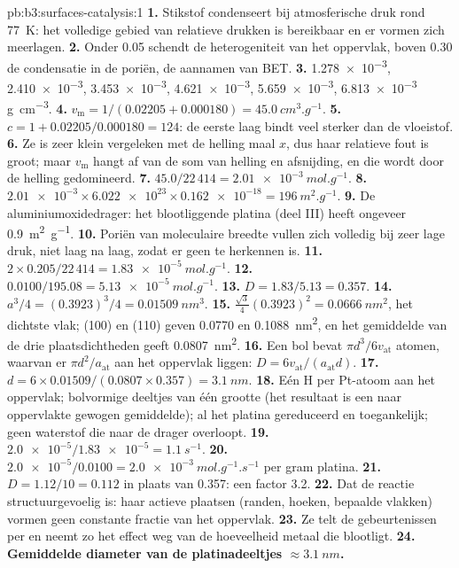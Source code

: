 \begin{solution}{pb:b3:surfaces-catalysis:1}
\textbf{1.} Stikstof condenseert bij atmosferische druk rond \qty{77}{K}: het
volledige gebied van relatieve drukken is bereikbaar en er vormen zich
meerlagen.
\textbf{2.} Onder 0.05 schendt de heterogeniteit van het oppervlak, boven
0.30 de condensatie in de poriën, de aannamen van BET.
\textbf{3.} \num{1.278e-3}, \num{2.410e-3}, \num{3.453e-3}, \num{4.621e-3}, \num{5.659e-3}, \num{6.813e-3} \unit{g.cm^{-3}}.
\textbf{4.} $v_{\mathrm m} = 1/(0.02205 + 0.000180) = \qty{45.0}{cm^3.g^{-1}}$.
\textbf{5.} $c = 1 + 0.02205/0.000180 = 124$: de eerste laag bindt veel sterker
dan de vloeistof.
\textbf{6.} Ze is zeer klein vergeleken met de helling maal $x$, dus haar
relatieve fout is groot; maar $v_{\mathrm m}$ hangt af van de som van helling en afsnijding, en die wordt door de helling
gedomineerd.
\textbf{7.} $45.0/22\,414 = \qty{2.01e-3}{mol.g^{-1}}$.
\textbf{8.} $\num{2.01e-3} \times \num{6.022e23} \times \num{0.162e-18} = \qty{196}{m^2.g^{-1}}$.
\textbf{9.} De aluminiumoxidedrager: het blootliggende platina (deel III)
heeft ongeveer \qty{0.9}{m^2.g^{-1}}.
\textbf{10.} Poriën van moleculaire breedte vullen zich volledig bij zeer
lage druk, niet laag na laag, zodat er geen  te herkennen is.
\textbf{11.} $2 \times 0.205/22\,414 = \qty{1.83e-5}{mol.g^{-1}}$.
\textbf{12.} $0.0100/195.08 = \qty{5.13e-5}{mol.g^{-1}}$.
\textbf{13.} $D = 1.83/5.13 = 0.357$.
\textbf{14.} $a^3/4 = (0.3923)^3/4 = \qty{0.01509}{nm^3}$.
\textbf{15.} $\frac{\sqrt3}{4}(0.3923)^2 = \qty{0.0666}{nm^2}$, het dichtste vlak; (100) en (110) geven 0.0770 en
\qty{0.1088}{nm^2}, en het gemiddelde van de drie plaatsdichtheden geeft \qty{0.0807}{nm^2}.
\textbf{16.} Een bol bevat $\pi d^3/6v_{\mathrm{at}}$ atomen, waarvan er $\pi d^2/a_{\mathrm{at}}$ aan het oppervlak liggen:
$D = 6v_{\mathrm{at}}/(a_{\mathrm{at}}d)$.
\textbf{17.} $d = 6 \times 0.01509/(0.0807 \times 0.357) = \qty{3.1}{nm}$.
\textbf{18.} Eén H per Pt-atoom aan het oppervlak; bolvormige deeltjes van
één grootte (het resultaat is een naar oppervlakte gewogen gemiddelde); al
het platina gereduceerd en toegankelijk; geen waterstof die naar de
drager overloopt.
\textbf{19.} $\num{2.0e-5}/\num{1.83e-5} = \qty{1.1}{s^{-1}}$.
\textbf{20.} $\num{2.0e-5}/0.0100 = \qty{2.0e-3}{mol.g^{-1}.s^{-1}}$ per gram platina.
\textbf{21.} $D = 1.12/10 = 0.112$ in plaats van 0.357: een factor 3.2.
\textbf{22.} Dat de reactie structuurgevoelig is: haar actieve plaatsen
(randen, hoeken, bepaalde vlakken) vormen geen constante fractie van het
oppervlak.
\textbf{23.} Ze telt de gebeurtenissen per  en neemt zo het
effect weg van de hoeveelheid metaal die blootligt.
\textbf{24.} \textbf{Gemiddelde diameter van de platinadeeltjes $\approx \qty{3.1}{nm}$.}
\end{solution}
